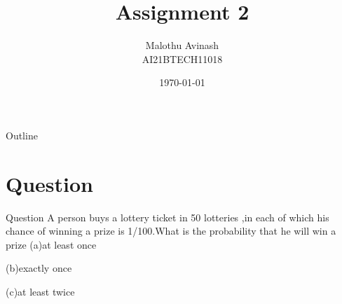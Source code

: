 \documentclass{beamer}
\title{Assignment 2}%
\author{Malothu Avinash \\ AI21BTECH11018}
\date{\today}
\begin{document}
\begin{frame}
    \titlepage 
\end{frame}



\begin{frame}{Outline}
    \tableofcontents
\end{frame}


\section{Question}
\begin{frame}{Question}
A person buys a lottery ticket in 50 lotteries ,in each of which his chance of winning a prize is 1/100.What is the probability that he will win a prize
(a)at least once
    
(b)exactly once
    
(c)at least twice
\end{frame}
\end{document}
